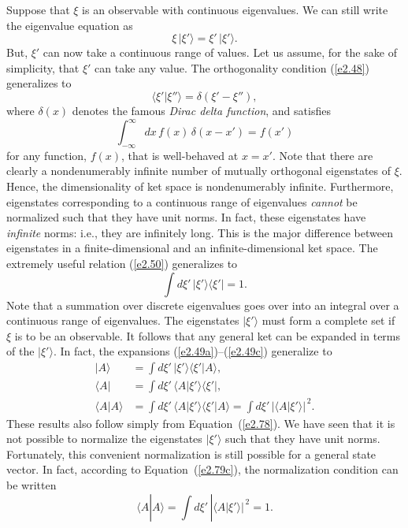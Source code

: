 Suppose that $\xi$ is an observable with continuous eigenvalues. We can still
write the eigenvalue equation as
\begin{equation}
\xi \,|\xi'\rangle =\xi'\, |\xi'\rangle.
\end{equation}
But, $\xi'$ can now take a continuous range of values. Let us assume, for
the sake of simplicity, that $\xi'$ can take any value. The orthogonality
condition (\ref{e2.48}) generalizes to
\begin{equation}\label{e2.77}
\langle \xi'|\xi''\rangle = \delta(\xi'-\xi''),
\end{equation}
where $\delta(x)$ denotes the famous {\em Dirac delta function}, and
satisfies
\begin{equation}
\int_{-\infty}^\infty dx\,f(x)\,\delta(x-x') =f(x')
\end{equation}
for any function, $f(x)$, that is well-behaved at $x=x'$. 
Note that there are
clearly a nondenumerably infinite number of mutually orthogonal eigenstates of $\xi$.
Hence, the dimensionality of ket space is nondenumerably infinite. Furthermore, eigenstates corresponding to a continuous range of eigenvalues {\em cannot}\/
be normalized such that they have unit norms. In fact, these eigenstates have
{\em infinite}\/ norms: {\rm i.e.}, they are infinitely long. This is the major difference
between eigenstates in a finite-dimensional and an infinite-dimensional ket space. 
The extremely useful relation (\ref{e2.50}) generalizes to
\begin{equation}\label{e2.78}
\int d\xi' \,|\xi'\rangle\langle \xi'| = 1.
\end{equation}
Note that a summation over discrete eigenvalues goes over into an integral over
a continuous range of eigenvalues. The eigenstates $|\xi'\rangle$ must form
a complete set if $\xi$ is to be an observable. It follows that any general
ket can be expanded in terms of the $|\xi'\rangle$. In fact, the expansions
(\ref{e2.49a})--(\ref{e2.49c}) generalize to
\begin{align}
|A\rangle &= \int d\xi'\,|\xi'\rangle\langle \xi'| A\rangle,\\[0.5ex]
\langle A| &= \int d\xi'\,\langle A|\xi'\rangle \langle \xi'|,\\[0.5ex]
\langle A|A\rangle &= \int d\xi'\,\langle A|\xi'\rangle\langle
\xi'|A\rangle = \int d\xi' \,|\langle A|\xi'\rangle|^{\,2}.\label{e2.79c}
\end{align}
These results also follow simply from Equation~(\ref{e2.78}). We have seen that it is not
possible to normalize the eigenstates $|\xi'\rangle$ such that they have unit norms.
Fortunately, this convenient  normalization is still
 possible for a general state vector.
In fact, according to Equation~(\ref{e2.79c}), the normalization condition can be written
\begin{equation}
\langle A|A\rangle =\int d\xi' \,|\langle A|\xi'\rangle|^{\,2} = 1.
\end{equation}

